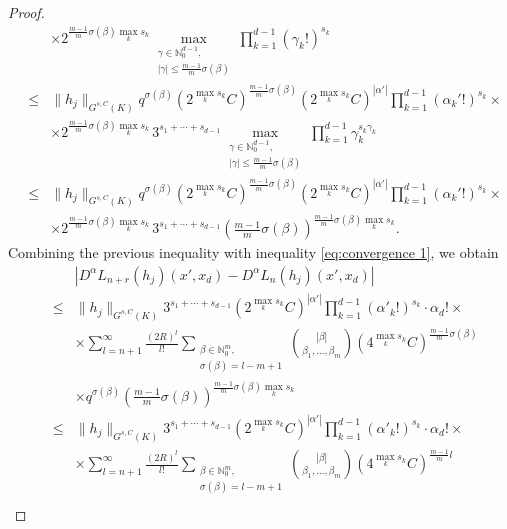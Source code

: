 \documentclass[a4paper,10pt]{amsart}
\newtheorem*{crucial lemma}{Lemma \ref{lem:nice polynomial2}}
\theoremstyle{definition}
\newcommand{\N}{\mathbb{N}}
\begin{document}
\begin{proof}
\begin{eqnarray*}
		&&\times 2^{\frac{m-1}{m}\sigma(\beta)\max_k s_k}\max_{\substack{\gamma\in\N_0^{d-1},\\ |\gamma|\leq \frac{m-1}{m}\sigma(\beta)}}\prod_{k=1}^{d-1}(\gamma_k!)^{s_k}\\
		&\leq& \|h_j\|_{G^{s,C}(K)}  q^{\sigma(\beta)} (2^{\max_k s_k} C)^{\frac{m-1}{m}\sigma(\beta)}(2^{\max_k s_k} C)^{|\alpha'|}\prod_{k=1}^{d-1}\left(\alpha_k'!\right)^{s_k}\times\\
		&&\times 2^{\frac{m-1}{m}\sigma(\beta)\max_k s_k}\,3^{s_1+\cdots+s_{d-1}}\max_{\substack{\gamma\in\N_0^{d-1},\\ |\gamma|\leq \frac{m-1}{m}\sigma(\beta)}}\prod_{k=1}^{d-1}\gamma_k^{s_k\gamma_k}\\
		&\leq& \|h_j\|_{G^{s,C}(K)}  q^{\sigma(\beta)} (2^{\max_k s_k} C)^{\frac{m-1}{m}\sigma(\beta)}(2^{\max_k s_k} C)^{|\alpha'|}\prod_{k=1}^{d-1}\left(\alpha_k'!\right)^{s_k}\times\\
		&&\times 2^{\frac{m-1}{m}\sigma(\beta)\max_k s_k}\,3^{s_1+\cdots+s_{d-1}}\left(\frac{m-1}{m}\sigma(\beta)\right)^{\frac{m-1}{m}\sigma(\beta)\max_k s_k}.
	\end{eqnarray*}
	Combining the previous inequality with inequality \eqref{eq:convergence 1}, we obtain
	\begin{eqnarray}\label{eq:convergence 2}
		&&|D^\alpha L_{n+r}(h_j)(x',x_d)-D^\alpha L_n(h_j)(x',x_d)|\nonumber\\
		&\leq& \|h_j\|_{G^{s,C}(K)} 3^{s_1+\cdots +s_{d-1}}\left(2^{\max_k s_k}C\right)^{|\alpha'|}\prod_{k=1}^{d-1}(\alpha'_k!)^{s_k}\cdot\alpha_d!\times\nonumber\\
		&&\times\sum_{l=n+1}^\infty \frac{(2R)^l}{l!}\sum\limits_{\substack{\beta\in\N_0^m,\\ \sigma(\beta)=l-m+1}}\binom{|\beta|}{\beta_1,\ldots,\beta_m} \nonumber \left(4^{\max_k s_k} C\right)^{\frac{m-1}{m}\sigma(\beta)}\\
		&&\times q^{\sigma(\beta)}\left(\frac{m-1}{m}\sigma(\beta)\right)^{\frac{m-1}{m}\sigma(\beta)\max_k s_k}\nonumber\\ 
		&\leq& \|h_j\|_{G^{s,C}(K)} 3^{s_1+\cdots +s_{d-1}}\left(2^{\max_k s_k}C\right)^{|\alpha'|}\prod_{k=1}^{d-1}(\alpha'_k!)^{s_k}\cdot\alpha_d!\times\nonumber\\
		&&\times\sum_{l=n+1}^\infty \frac{(2R)^l}{l!}\sum\limits_{\substack{\beta\in\N_0^m,\\ \sigma(\beta)=l-m+1}}\binom{|\beta|}{\beta_1,\ldots,\beta_m} \left(4^{\max_k s_k} C\right)^{\frac{m-1}{m}l}\nonumber\\

\end{eqnarray}
\end{proof}
\end{document}
